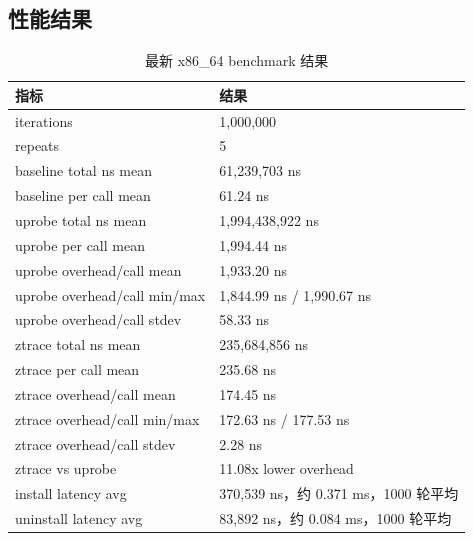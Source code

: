 \documentclass[UTF8,a4paper,11pt,fontset=fandol]{ctexart}
\begin{document}
\subsection{性能结果}

\begin{table}[H]
\centering
\caption{最新 x86\_64 benchmark 结果}
\label{tab:benchmark}
\begin{tabularx}{\textwidth}{P{5.4cm}Y}
\toprule
\textbf{指标} & \textbf{结果}\\
\midrule
iterations & 1,000,000\\
repeats & 5\\
baseline total ns mean & 61,239,703 ns\\
baseline per call mean & 61.24 ns\\
uprobe total ns mean & 1,994,438,922 ns\\
uprobe per call mean & 1,994.44 ns\\
uprobe overhead/call mean & 1,933.20 ns\\
uprobe overhead/call min/max & 1,844.99 ns / 1,990.67 ns\\
uprobe overhead/call stdev & 58.33 ns\\
ztrace total ns mean & 235,684,856 ns\\
ztrace per call mean & 235.68 ns\\
ztrace overhead/call mean & 174.45 ns\\
ztrace overhead/call min/max & 172.63 ns / 177.53 ns\\
ztrace overhead/call stdev & 2.28 ns\\
ztrace vs uprobe & 11.08x lower overhead\\
install latency avg & 370,539 ns，约 0.371 ms，1000 轮平均\\
uninstall latency avg & 83,892 ns，约 0.084 ms，1000 轮平均\\
\bottomrule
\end{tabularx}
\end{table}
\end{document}
